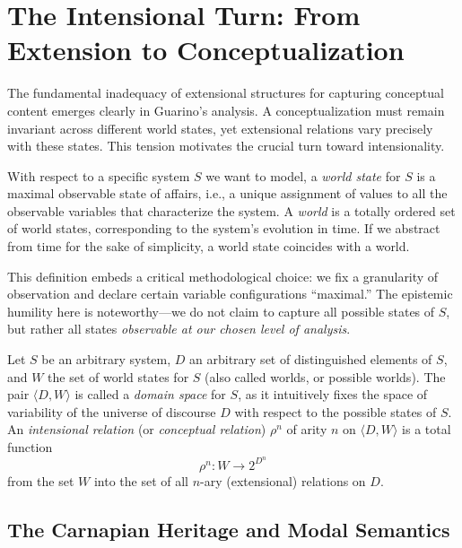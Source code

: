 \section{The Intensional Turn: From Extension to Conceptualization}

The fundamental inadequacy of extensional structures for capturing conceptual content emerges clearly in Guarino's analysis. A conceptualization must remain invariant across different world states, yet extensional relations vary precisely with these states. This tension motivates the crucial turn toward intensionality.

\begin{definition}
	With respect to a specific system $S$ we want to model, a \emph{world state} for $S$ is a maximal observable state of affairs, i.e., a unique assignment of values to all the observable variables that characterize the system. A \emph{world} is a totally ordered set of world states, corresponding to the system's evolution in time. If we abstract from time for the sake of simplicity, a world state coincides with a world.
\end{definition}

This definition embeds a critical methodological choice: we fix a granularity of observation and declare certain variable configurations ``maximal.'' The epistemic humility here is noteworthy—we do not claim to capture all possible states of $S$, but rather all states \emph{observable at our chosen level of analysis}.

\begin{definition}
	Let $S$ be an arbitrary system, $D$ an arbitrary set of distinguished elements of $S$, and $W$ the set of world states for $S$ (also called worlds, or possible worlds). The pair $\langle D, W \rangle$ is called a \emph{domain space} for $S$, as it intuitively fixes the space of variability of the universe of discourse $D$ with respect to the possible states of $S$. An \emph{intensional relation} (or \emph{conceptual relation}) $\rho^n$ of arity $n$ on $\langle D, W \rangle$ is a total function
	$$\rho^n : W \to 2^{D^n}$$
	from the set $W$ into the set of all $n$-ary (extensional) relations on $D$.
\end{definition}

\subsection{The Carnapian Heritage and Modal Semantics}

